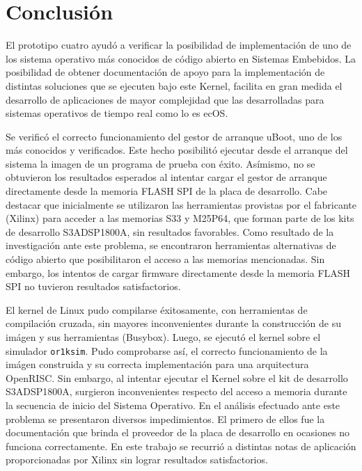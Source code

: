 		
		\newpage
		\section{Conclusión}
		El prototipo cuatro ayudó a verificar la posibilidad de implementación de uno de los sistema operativo más conocidos de código abierto en Sistemas Embebidos.
		La posibilidad de obtener documentación de apoyo para la implementación de distintas soluciones que se ejecuten bajo este Kernel, facilita en gran
		medida el desarrollo de aplicaciones de mayor complejidad que las desarrolladas para sistemas operativos de tiempo real como lo es ecOS.   
		
		Se verificó el correcto funcionamiento del gestor de arranque uBoot, uno de los más conocidos y verificados. Este hecho posibilitó ejecutar desde el
		arranque del sistema la imagen de un programa de prueba con éxito. Asímismo, no se obtuvieron los resultados esperados al intentar cargar el gestor
		de arranque directamente desde la memoria FLASH SPI de la placa de desarrollo. Cabe destacar que inicialmente se utilizaron las herramientas
		provistas por el fabricante (Xilinx) para acceder a las memorias S33 y M25P64, que forman parte de los kits de desarrollo S3ADSP1800A, sin
		resultados favorables. Como resultado de la investigación ante este problema, se encontraron herramientas alternativas de código abierto que
		posibilitaron el acceso a las memorias mencionadas. Sin embargo, los intentos de cargar firmware directamente desde la memoria FLASH SPI no tuvieron
		resultados satisfactorios. %
		
		El kernel de Linux pudo compilarse éxitosamente, con herramientas de compilación cruzada, sin mayores inconvenientes durante la construcción de su
		imágen y sus herramientas (Busybox). Luego, se ejecutó el kernel sobre el simulador \verb|or1ksim|. Pudo
		comprobarse así, el correcto funcionamiento de la imágen construida y su correcta implementación para una arquitectura OpenRISC. Sin embargo, al
		intentar ejecutar el Kernel sobre el kit de desarrollo S3ADSP1800A, surgieron inconvenientes respecto del acceso a memoria durante la secuencia de
		inicio del Sistema Operativo. En el análisis efectuado ante este problema se presentaron diversos impedimientos. El primero de ellos fue la
		documentación que brinda el proveedor de la placa de desarrollo en ocasiones no funciona correctamente. En este trabajo se recurrió a
		distintas notas de aplicación proporcionadas por Xilinx sin lograr resultados satisfactorios. 
		
